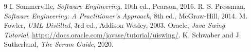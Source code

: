 \documentclass[12pt,a4paper]{article}
\begin{document}
\begin{thebibliography}{9}
 I. Sommerville, \textit{Software Engineering}, 10th ed., Pearson, 2016.
 R. S. Pressman, \textit{Software Engineering: A Practitioner's Approach}, 8th ed., McGraw-Hill, 2014.
 M. Fowler, \textit{UML Distilled}, 3rd ed., Addison-Wesley, 2003.
 Oracle, \textit{Java Swing Tutorial}, \url{https://docs.oracle.com/javase/tutorial/uiswing/}.
 K. Schwaber and J. Sutherland, \textit{The Scrum Guide}, 2020.
\end{thebibliography}
\end{document}
